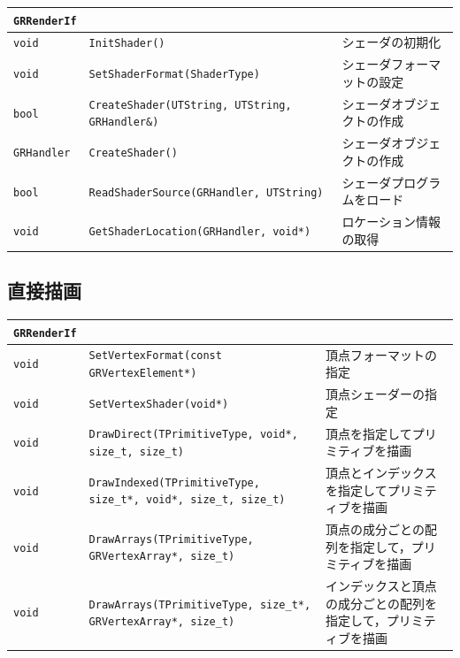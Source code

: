 \begin{center}
\begin{tabular}{p{.15\hsize}p{.4\hsize}p{.35\hsize}}
\texttt{GRRenderIf}												&								\\ \midrule
\texttt{void} 		& \texttt{InitShader()}										& シェーダの初期化				\\
\texttt{void} 		& \texttt{SetShaderFormat(ShaderType)}						& シェーダフォーマットの設定	\\
\texttt{bool} 		& \texttt{CreateShader(UTString, UTString, GRHandler\&)}	& シェーダオブジェクトの作成	\\
\texttt{GRHandler} 	& \texttt{CreateShader()}									& シェーダオブジェクトの作成	\\
\texttt{bool} 		& \texttt{ReadShaderSource(GRHandler, UTString)}			& シェーダプログラムをロード	\\
\texttt{void} 		& \texttt{GetShaderLocation(GRHandler, void*)}				& ロケーション情報の取得		\\
\end{tabular}
\end{center}

\subsection*{直接描画}

\begin{center}
\begin{tabular}{p{.1\hsize}p{.45\hsize}p{.35\hsize}}
\texttt{GRRenderIf}																\\ \midrule
\texttt{void} & \texttt{SetVertexFormat(const GRVertexElement*)}							& 頂点フォーマットの指定	\\
\texttt{void} & \texttt{SetVertexShader(void*)}											& 頂点シェーダーの指定		\\
\texttt{void} & \texttt{DrawDirect(TPrimitiveType, void*, size\_t, size\_t)}				& 頂点を指定してプリミティブを描画	\\
\texttt{void} & \texttt{DrawIndexed(TPrimitiveType, size\_t*, void*, size\_t, size\_t)}	& 頂点とインデックスを指定してプリミティブを描画	\\
\texttt{void} & \texttt{DrawArrays(TPrimitiveType, GRVertexArray*, size\_t)}				& 頂点の成分ごとの配列を指定して，プリミティブを描画	\\
\texttt{void} & \texttt{DrawArrays(TPrimitiveType, size\_t*, GRVertexArray*, size\_t)}		& インデックスと頂点の成分ごとの配列を指定して，プリミティブを描画	\\
\end{tabular}
\end{center}


